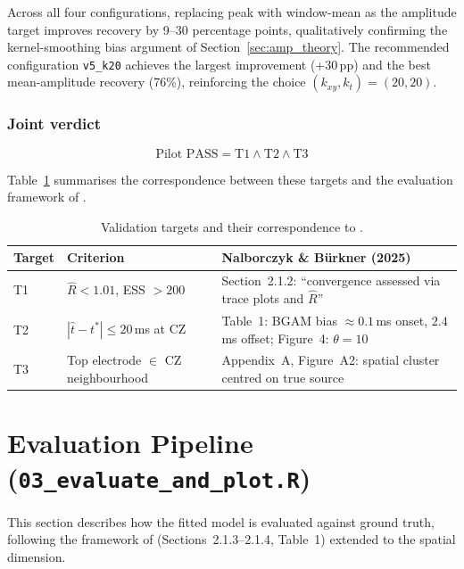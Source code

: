 \documentclass[12pt, a4paper]{article}
\begin{document}
Across all four configurations, replacing peak with window-mean as
the amplitude target improves recovery by 9--30 percentage points,
qualitatively confirming the kernel-smoothing bias argument of
Section~\ref{sec:amp_theory}. The recommended configuration
\texttt{v5\_k20} achieves the largest improvement (+30\,pp) and the
best mean-amplitude recovery (76\%), reinforcing the choice
$(k_{xy}, k_t) = (20, 20)$.

\subsubsection*{Joint verdict}

\begin{equation}\label{eq:pilot_pass}
  \text{Pilot PASS} = \text{T1} \wedge \text{T2} \wedge \text{T3}
\end{equation}

Table~\ref{tab:targets} summarises the correspondence between these
targets and the evaluation framework of \citet{Nalborczyk2025}.

\begin{table}[ht]
\centering
\caption{Validation targets and their correspondence to
\citet{Nalborczyk2025}.}
\label{tab:targets}
\small
\begin{tabular}{p{1cm} p{4.5cm} p{7cm}}
\toprule
\textbf{Target} & \textbf{Criterion} & \textbf{Nalborczyk \& Bürkner (2025)} \\
\midrule
T1 & $\hat{R} < 1.01$, ESS $> 200$
   & Section~2.1.2: ``convergence assessed via trace plots
     and $\hat{R}$'' \\[4pt]
T2 & $|\hat{t} - t^*| \le 20$\,ms at CZ
   & Table~1: BGAM bias $\approx 0.1$\,ms onset,
     $2.4$\,ms offset; Figure~4: $\theta = 10$ \\[4pt]
T3 & Top electrode $\in$ CZ neighbourhood
   & Appendix~A, Figure~A2: spatial cluster
     centred on true source \\
\bottomrule
\end{tabular}
\end{table}

\section{Evaluation Pipeline (\texttt{03\_evaluate\_and\_plot.R})}\label{sec:eval}

This section describes how the fitted model is evaluated against ground truth,
following the framework of \citet{Nalborczyk2025} (Sections~2.1.3--2.1.4,
Table~1) extended to the spatial dimension.
\end{document}
